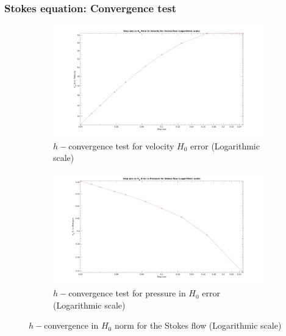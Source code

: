 \documentclass{beamer}
\begin{document}
\begin{frame}
\frametitle{Stokes equation: Convergence test}
\begin{figure}
\begin{subfigure}{0.4\textwidth}	
  \includegraphics[width=\linewidth]{h0_velocity_log_stokes.jpg}
  \caption{$h-$convergence test for velocity $H_0$ error (Logarithmic scale)}
  \label{fig:vel_stoke_conv_log_h0}
\end{subfigure}
\begin{subfigure}{0.4\textwidth}	
  \includegraphics[width=\linewidth]{h0_pressure_log_stokes.jpg}
  \caption{$h-$convergence test for pressure in $H_0$ error (Logarithmic scale)}
  \label{fig:pre_stoke_conv_log_h0}
\end{subfigure}
\caption{$h-$convergence in $H_0$ norm for the Stokes flow (Logarithmic scale)}
\label{fig:h0_stokes}
\end{figure}
\end{frame}
\end{document}
